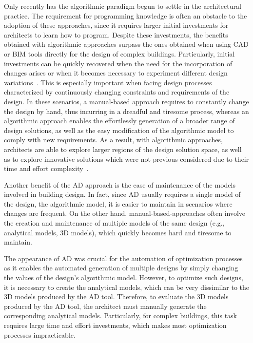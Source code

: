 Only recently has the algorithmic paradigm begun to settle in the architectural practice. The requirement for programming knowledge is often an obstacle to the adoption of these approaches, since it requires larger initial investments for architects to learn how to program. Despite these investments, the benefits obtained with algorithmic approaches surpass the ones obtained when using \ac{CAD} or \ac{BIM} tools directly for the design of complex buildings. Particularly, initial investments can be quickly recovered when the need for the incorporation of changes arises or when it becomes necessary to experiment different design variations~\cite{Leitao2014GD}. This is especially important when facing design processes characterized by continuously changing constraints and requirements of the design. In these scenarios, a manual-based approach requires to constantly change the design by hand, thus incurring in a dreadful and tiresome process, whereas an algorithmic approach enables the effortlessly generation of a broader range of design solutions, as well as the easy modification of the algorithmic model to comply with new requirements. As a result, with algorithmic approaches, architects are able to explore larger regions of the design solution space, as well as to explore innovative solutions which were not previous considered due to their time and effort complexity~\cite{Leitao2014GD}.

Another benefit of the \ac{AD} approach is the ease of maintenance of the models involved in building design. In fact, since \ac{AD} usually requires a single model of the design, the algorithmic model, it is easier to maintain in scenarios where changes are frequent. On the other hand, manual-based-approaches often involve the creation and maintenance of multiple models of the same design (e.g., analytical models, 3D models), which quickly becomes hard and tiresome to maintain.

The appearance of \ac{AD} was crucial for the automation of optimization processes as it enables the automated generation of multiple designs by simply changing the values of the design's algorithmic model. However, to optimize such designs, it is necessary to create the analytical models, which can be very dissimilar to the 3D models produced by the \ac{AD} tool. Therefore, to evaluate the 3D models produced by the \ac{AD} tool, the architect must manually generate the corresponding analytical models. Particularly, for complex buildings, this task requires large time and effort investments, which makes most optimization processes impracticable.

